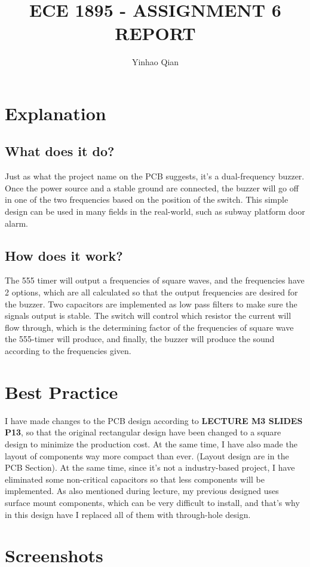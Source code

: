 \documentclass{article}
\title{ECE 1895 - ASSIGNMENT 6 REPORT}
\author{Yinhao Qian}
\begin{document}
	\maketitle
	\section{Explanation}
	\subsection{What does it do?}
	Just as what the project name on the PCB suggests, it's a dual-frequency buzzer. Once the power source and a stable ground are connected, the buzzer will go off in one of the two frequencies based on the position of the switch. This simple design can be used in many fields in the real-world, such as subway platform door alarm. 
	\subsection{How does it work?}
	The 555 timer will output a frequencies of square waves, and the frequencies have 2 options, which are all calculated so that the output frequencies are desired for the buzzer. Two capacitors are implemented as low pass filters to make sure the signals output is stable. The switch will control which resistor the current will flow through, which is the determining factor of the frequencies of square wave the 555-timer will produce, and finally, the buzzer will produce the sound according to the frequencies given. 
	\section{Best Practice}
	I have made changes to the PCB design according to \textbf{LECTURE M3 SLIDES P13}, so that the original rectangular design have been changed to a square design to minimize the production cost. At the same time, I have also made the layout of components way more compact than ever. (Layout design are in the PCB Section). At the same time, since it's not a industry-based project, I have eliminated some non-critical capacitors so that less components will be implemented.\newline
	As also mentioned during lecture, my previous designed uses surface mount components, which can be very difficult to install, and that's why in this design have I replaced all of them with through-hole design.
	\section{Screenshots}
\end{document}
